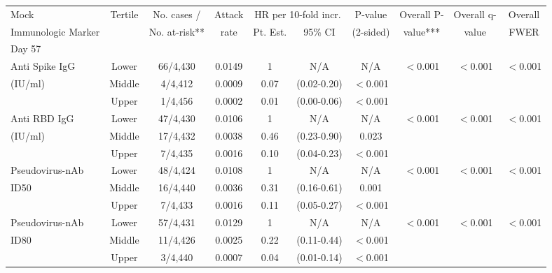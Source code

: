 \begin{tabular}{lccccccccc}
   \hline
 
         \multicolumn{1}{l}{Mock} & \multicolumn{1}{c}{Tertile}   & \multicolumn{1}{c}{No. cases /}   & \multicolumn{1}{c}{Attack}   & \multicolumn{2}{c}{HR per 10-fold incr.}                     & \multicolumn{1}{c}{P-value}   & \multicolumn{1}{c}{Overall P-}      & \multicolumn{1}{c}{Overall q-}   & \multicolumn{1}{c}{Overall} \\ 
         \multicolumn{1}{l}{Immunologic Marker}            & \multicolumn{1}{c}{}          & \multicolumn{1}{c}{No. at-risk**} & \multicolumn{1}{c}{rate}   & \multicolumn{1}{c}{Pt. Est.} & \multicolumn{1}{c}{95\% CI} & \multicolumn{1}{c}{(2-sided)} & \multicolumn{1}{c}{value***} & \multicolumn{1}{c}{value} & \multicolumn{1}{c}{FWER} \\ 
         \hline
 
            
 \multicolumn{8}{l}{Day 57} \\ 
Anti Spike IgG & Lower & 66/4,430 & 0.0149 & 1 & N/A & N/A & $<$0.001 & $<$0.001 & $<$0.001 \\ 
  (IU/ml) & Middle & 4/4,412 & 0.0009 & 0.07 & (0.02-0.20) & $<$0.001 &     &     &     \\ 
   & Upper & 1/4,456 & 0.0002 & 0.01 & (0.00-0.06) & $<$0.001 &     &     &     \\ 
  Anti RBD IgG & Lower & 47/4,430 & 0.0106 & 1 & N/A & N/A & $<$0.001 & $<$0.001 & $<$0.001 \\ 
  (IU/ml) & Middle & 17/4,432 & 0.0038 & 0.46 & (0.23-0.90) & 0.023 &     &     &     \\ 
   & Upper & 7/4,435 & 0.0016 & 0.10 & (0.04-0.23) & $<$0.001 &     &     &     \\ 
  Pseudovirus-nAb & Lower & 48/4,424 & 0.0108 & 1 & N/A & N/A & $<$0.001 & $<$0.001 & $<$0.001 \\ 
  ID50 & Middle & 16/4,440 & 0.0036 & 0.31 & (0.16-0.61) & 0.001 &     &     &     \\ 
   & Upper & 7/4,433 & 0.0016 & 0.11 & (0.05-0.27) & $<$0.001 &     &     &     \\ 
  Pseudovirus-nAb & Lower & 57/4,431 & 0.0129 & 1 & N/A & N/A & $<$0.001 & $<$0.001 & $<$0.001 \\ 
  ID80 & Middle & 11/4,426 & 0.0025 & 0.22 & (0.11-0.44) & $<$0.001 &     &     &     \\ 
   & Upper & 3/4,440 & 0.0007 & 0.04 & (0.01-0.14) & $<$0.001 &     &     &     \\ 
          

\end{tabular}

